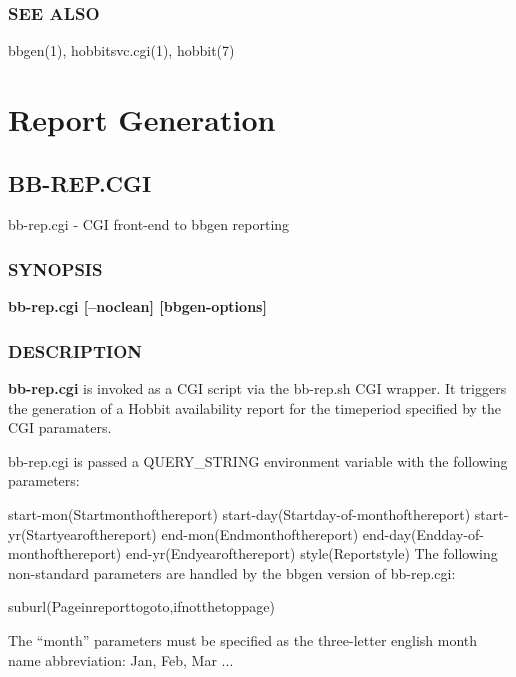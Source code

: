 \subsection{SEE ALSO}
bbgen(1), hobbitsvc.cgi(1), hobbit(7) 

%
\chapter{Report Generation}
%
\newpage
\section{BB-REP.CGI}

 bb-rep.cgi - CGI front-end to bbgen reporting
 \subsection{SYNOPSIS}
\textbf{bb-rep.cgi [--noclean] [bbgen-options]}


 
\subsection{DESCRIPTION}
\textbf{bb-rep.cgi}
 is invoked as a CGI script via the bb-rep.sh CGI wrapper. It triggers the generation of a Hobbit availability report for the timeperiod specified by the CGI paramaters. 

  bb-rep.cgi is passed a QUERY\_STRING environment variable with the following parameters: 


  
start-mon(Startmonthofthereport)  
start-day(Startday-of-monthofthereport)  
start-yr(Startyearofthereport)  
end-mon(Endmonthofthereport)  
end-day(Endday-of-monthofthereport)  
end-yr(Endyearofthereport)  
style(Reportstyle)  
 The following non-standard parameters are handled by the bbgen version of bb-rep.cgi: 


  
suburl(Pageinreporttogoto,ifnotthetoppage) 


  The ``month'' parameters must be specified as the three-letter english month name abbreviation: Jan, Feb, Mar ... 


